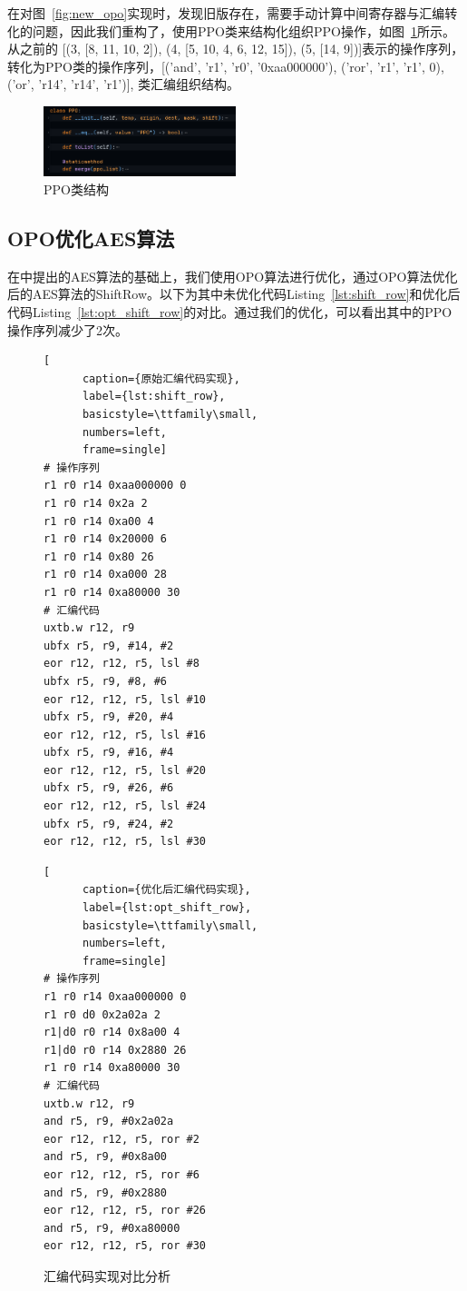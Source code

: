 \documentclass[11pt,a4paper]{article}
\begin{document}
在对图~\ref{fig:new_opo}实现时，发现旧版存在，需要手动计算中间寄存器与汇编转化的问题，因此我们重构了，使用PPO类来结构化组织PPO操作，如图~\ref{fig:ppo}所示。 从之前的 [(3, [8, 11, 10, 2]), (4, [5, 10, 4, 6, 12, 15]), (5, [14, 9])]表示的操作序列，转化为PPO类的操作序列，[('and', 'r1', 'r0', '0xaa000000'), ('ror', 'r1', 'r1', 0), ('or', 'r14', 'r14', 'r1')], 类汇编组织结构。

\begin{figure}[h]
  \centering
  \includegraphics[width=0.5\textwidth]{./fig/ppo_class.png}
  \caption{PPO类结构}
  \label{fig:ppo}
\end{figure}

\subsection{OPO优化AES算法}
在\cite{Schwabe2016}中提出的AES算法的基础上，我们使用OPO算法进行优化，通过OPO算法优化后的AES算法的ShiftRow。以下为其中未优化代码Listing~\ref{lst:shift_row}和优化后代码Listing~\ref{lst:opt_shift_row}的对比。通过我们的优化，可以看出其中的PPO操作序列减少了2次。

\begin{figure}[ht]
  \begin{minipage}{\textwidth}
  \begin{multicols}{2}
  \begin{lstlisting}[
      caption={原始汇编代码实现},
      label={lst:shift_row},
      basicstyle=\ttfamily\small,
      numbers=left,
      frame=single]
# 操作序列
r1 r0 r14 0xaa000000 0
r1 r0 r14 0x2a 2
r1 r0 r14 0xa00 4
r1 r0 r14 0x20000 6
r1 r0 r14 0x80 26
r1 r0 r14 0xa000 28
r1 r0 r14 0xa80000 30
# 汇编代码
uxtb.w r12, r9
ubfx r5, r9, #14, #2
eor r12, r12, r5, lsl #8
ubfx r5, r9, #8, #6
eor r12, r12, r5, lsl #10
ubfx r5, r9, #20, #4
eor r12, r12, r5, lsl #16
ubfx r5, r9, #16, #4
eor r12, r12, r5, lsl #20
ubfx r5, r9, #26, #6
eor r12, r12, r5, lsl #24
ubfx r5, r9, #24, #2
eor r12, r12, r5, lsl #30
  \end{lstlisting}
  \columnbreak
  \begin{lstlisting}[
      caption={优化后汇编代码实现},
      label={lst:opt_shift_row},
      basicstyle=\ttfamily\small,
      numbers=left,
      frame=single]
# 操作序列
r1 r0 r14 0xaa000000 0
r1 r0 d0 0x2a02a 2
r1|d0 r0 r14 0x8a00 4
r1|d0 r0 r14 0x2880 26
r1 r0 r14 0xa80000 30
# 汇编代码
uxtb.w r12, r9
and r5, r9, #0x2a02a
eor r12, r12, r5, ror #2
and r5, r9, #0x8a00
eor r12, r12, r5, ror #6
and r5, r9, #0x2880
eor r12, r12, r5, ror #26
and r5, r9, #0xa80000
eor r12, r12, r5, ror #30
  \end{lstlisting}
  \end{multicols}
  \caption{汇编代码实现对比分析}
  \label{fig:code_comparison}
  \end{minipage}
\end{figure}
\end{document}
